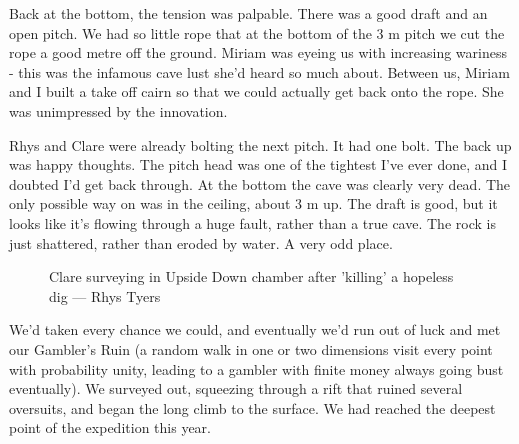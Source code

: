 Back at the bottom, the tension was palpable. There was a good draft and an open pitch. We had so little rope that at the bottom of the 3 m pitch we cut the rope a good metre off the ground. Miriam was eyeing us with increasing wariness - this was the infamous cave lust she’d heard so much about. Between us, Miriam and I built a take off cairn so that we could actually get back onto the rope. She was unimpressed by the innovation.
 
Rhys and Clare were already bolting the next pitch. It had one bolt. The back up was happy thoughts. The pitch head was one of the tightest I’ve ever done, and I doubted I’d get back through. At the bottom the cave was clearly very dead. The only possible way on was in the ceiling, about 3 m up. The draft is good, but it looks like it’s flowing through a huge fault, rather than a true cave. The rock is just shattered, rather than eroded by water. A very odd place.

\begin{figure}[h]
\checkoddpage \ifoddpage \forcerectofloat \else \forceversofloat \fi
\centering
{}
\caption{Clare surveying in Upside Down chamber after 'killing' a hopeless dig --- Rhys Tyers}
\label{Tight}
\end{figure}
 
We’d taken every chance we could, and eventually we’d run out of luck and met our Gambler’s Ruin (a random walk in one or two dimensions visit every point with probability unity, leading to a gambler with finite money always going bust eventually). We surveyed out, squeezing through a rift that ruined several oversuits, and began the long climb to the surface. We had reached the deepest point of the expedition this year.
 
